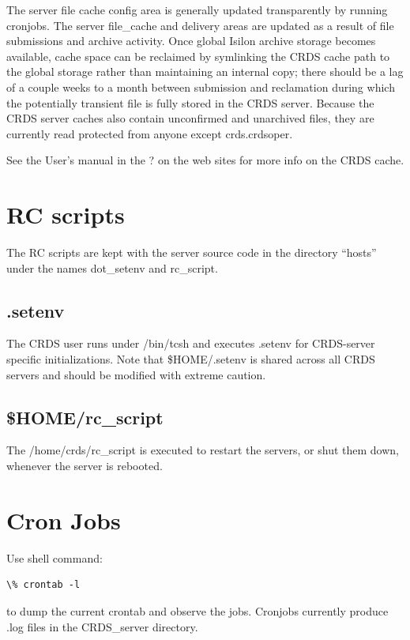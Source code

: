 \documentclass[letterpaper,10pt,english]{sphinxmanual}
\begin{document}
The server file cache config area is generally updated transparently by running cronjobs.   The server file\_cache
and delivery areas are updated as a result of file submissions and archive activity.  Once global Isilon archive storage
becomes available, cache space can be reclaimed by symlinking the CRDS cache path to the global storage rather than
maintaining an internal copy;  there should be a lag of a couple weeks to a month between submission and reclamation
during which the potentially transient file is fully stored in the CRDS server.   Because the CRDS server caches also
contain unconfirmed and unarchived files,  they are currently read protected from anyone except crds.crdsoper.

See the User's manual in the ? on the web sites for more info on the CRDS cache.


\chapter{RC scripts}
\label{server_guide:rc-scripts}
The RC scripts are kept with the server source code in the directory ``hosts'' under the names dot\_setenv and
rc\_script.


\section{.setenv}
\label{server_guide:setenv}
The CRDS user runs under /bin/tcsh and executes .setenv for CRDS-server specific initializations.   Note that
\$HOME/.setenv is shared across all CRDS servers and should be modified with extreme caution.


\section{\$HOME/rc\_script}
\label{server_guide:home-rc-script}
The /home/crds/rc\_script is executed to restart the servers,  or shut them down,  whenever the server is rebooted.


\chapter{Cron Jobs}
\label{server_guide:cron-jobs}
Use shell command:

\begin{Verbatim}[commandchars=\\\{\}]
\% crontab -l
\end{Verbatim}

to dump the current crontab and observe the jobs.   Cronjobs currently produce .log files in the CRDS\_server directory.
\end{document}
